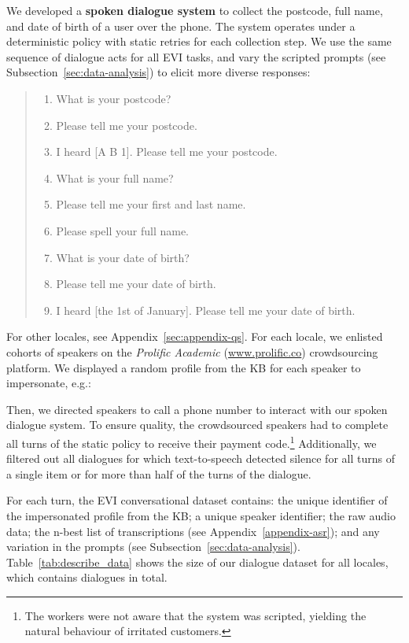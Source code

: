\documentclass[11pt]{article}
\begin{document}
{We developed a \textbf{spoken dialogue system}
to collect the postcode, full name, and date of birth
of a user over the phone.
The system operates under a deterministic policy
with static retries for each collection step.
We use the same sequence of dialogue acts for all EVI tasks,
and vary the scripted prompts (see Subsection~\ref{sec:data-analysis}) to elicit more diverse responses:
\begin{quote}
{\small
\begin{enumerate}[label=Q\arabic*:,align=left, leftmargin=*]
    \item What is your postcode?
    \item Please tell me your postcode.
    \item I heard [A B 1]. Please tell me your postcode.
    \item What is your full name?
    \item Please tell me your first and last name.
    \item Please spell your full name.
    \item What is your date of birth?
    \item Please tell me your date of birth.
    \item I heard [the 1st of January]. Please tell me your date of birth.
\end{enumerate}}\end{quote}

For other locales, see Appendix~\ref{sec:appendix-qs}. For each locale, we enlisted cohorts of speakers on the \emph{Prolific Academic} (\url{www.prolific.co}) crowdsourcing platform. We displayed a random profile from the KB for each speaker to impersonate, e.g.:


\vspace{-2.5mm}
{\small
}Then, we directed speakers to call a phone number to interact with our spoken dialogue system. To ensure quality, the crowdsourced speakers had to complete all turns of the static policy to receive their payment code.\footnote{The workers were not aware that the system was scripted, yielding the natural behaviour of irritated customers.}
Additionally, we filtered out all dialogues for which text-to-speech detected silence for all turns of a single item or for more than half of the turns of the dialogue.

For each turn, the EVI conversational dataset contains:
the unique identifier of the impersonated profile from the KB;
a unique speaker identifier;
the raw audio data;
the n-best list of transcriptions (see Appendix~\ref{appendix-asr});
and any variation in the prompts
(see Subsection~\ref{sec:data-analysis}).
Table~\ref{tab:describe_data} shows the size of our dialogue dataset for all locales, which contains  dialogues in total.

}
\end{document}
